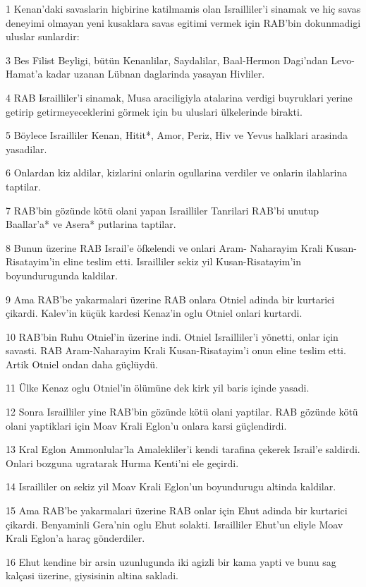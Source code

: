 \par 1 Kenan'daki savaslarin hiçbirine katilmamis olan Israilliler'i sinamak ve hiç savas deneyimi olmayan yeni kusaklara savas egitimi vermek için RAB'bin dokunmadigi uluslar sunlardir:
\par 3 Bes Filist Beyligi, bütün Kenanlilar, Saydalilar, Baal-Hermon Dagi'ndan Levo-Hamat'a kadar uzanan Lübnan daglarinda yasayan Hivliler.
\par 4 RAB Israilliler'i sinamak, Musa araciligiyla atalarina verdigi buyruklari yerine getirip getirmeyeceklerini görmek için bu uluslari ülkelerinde birakti.
\par 5 Böylece Israilliler Kenan, Hitit*, Amor, Periz, Hiv ve Yevus halklari arasinda yasadilar.
\par 6 Onlardan kiz aldilar, kizlarini onlarin ogullarina verdiler ve onlarin ilahlarina taptilar.
\par 7 RAB'bin gözünde kötü olani yapan Israilliler Tanrilari RAB'bi unutup Baallar'a* ve Asera* putlarina taptilar.
\par 8 Bunun üzerine RAB Israil'e öfkelendi ve onlari Aram- Naharayim Krali Kusan-Risatayim'in eline teslim etti. Israilliler sekiz yil Kusan-Risatayim'in boyundurugunda kaldilar.
\par 9 Ama RAB'be yakarmalari üzerine RAB onlara Otniel adinda bir kurtarici çikardi. Kalev'in küçük kardesi Kenaz'in oglu Otniel onlari kurtardi.
\par 10 RAB'bin Ruhu Otniel'in üzerine indi. Otniel Israilliler'i yönetti, onlar için savasti. RAB Aram-Naharayim Krali Kusan-Risatayim'i onun eline teslim etti. Artik Otniel ondan daha güçlüydü.
\par 11 Ülke Kenaz oglu Otniel'in ölümüne dek kirk yil baris içinde yasadi.
\par 12 Sonra Israilliler yine RAB'bin gözünde kötü olani yaptilar. RAB gözünde kötü olani yaptiklari için Moav Krali Eglon'u onlara karsi güçlendirdi.
\par 13 Kral Eglon Ammonlular'la Amalekliler'i kendi tarafina çekerek Israil'e saldirdi. Onlari bozguna ugratarak Hurma Kenti'ni ele geçirdi.
\par 14 Israilliler on sekiz yil Moav Krali Eglon'un boyundurugu altinda kaldilar.
\par 15 Ama RAB'be yakarmalari üzerine RAB onlar için Ehut adinda bir kurtarici çikardi. Benyaminli Gera'nin oglu Ehut solakti. Israilliler Ehut'un eliyle Moav Krali Eglon'a haraç gönderdiler.
\par 16 Ehut kendine bir arsin uzunlugunda iki agizli bir kama yapti ve bunu sag kalçasi üzerine, giysisinin altina sakladi.
